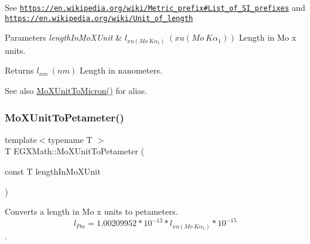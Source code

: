 See \href{https://en.wikipedia.org/wiki/Metric_prefix#List_of_SI_prefixes}{\tt https\+://en.\+wikipedia.\+org/wiki/\+Metric\+\_\+prefix\#\+List\+\_\+of\+\_\+\+S\+I\+\_\+prefixes} and \href{https://en.wikipedia.org/wiki/Unit_of_length}{\tt https\+://en.\+wikipedia.\+org/wiki/\+Unit\+\_\+of\+\_\+length} 
\begin{DoxyParams}{Parameters}
{\em length\+In\+Mo\+X\+Unit} & $ l_{xu(Mo\ K\alpha_1)}\ (xu(Mo\ K\alpha_1))$ Length in Mo x units. \\
\hline
\end{DoxyParams}
\begin{DoxyReturn}{Returns}
$ l_{nm}\ (nm)$ Length in nanometers. 
\end{DoxyReturn}
\begin{DoxySeeAlso}{See also}
\mbox{\hyperlink{group___e_g_x_math-_conversions-_length_conversions-_non-_s_i-_mo_x_unit-_non-_s_i_ga8fa37a1f86f7b01d2ca395fb7d2b75ce}{Mo\+X\+Unit\+To\+Micron()}} for alias. 
\end{DoxySeeAlso}
\mbox{\label{group___e_g_x_math-_conversions-_length_conversions-_non-_s_i-_mo_x_unit-_s_i_gadaa6c90eb9cf739e3bfd9fd66d6a998a}} 
\subsubsection{\texorpdfstring{Mo\+X\+Unit\+To\+Petameter()}{MoXUnitToPetameter()}}
{\footnotesize\ttfamily template$<$typename T $>$ \\
T E\+G\+X\+Math\+::\+Mo\+X\+Unit\+To\+Petameter (\begin{DoxyParamCaption}\item[{const T}]{length\+In\+Mo\+X\+Unit }\end{DoxyParamCaption})}



Converts a length in Mo x units to petameters. \[ l_{Pm}=1.00209952*10^{-13} * l_{xu(Mo\ K\alpha_1)} * 10^{-15} \]. 

